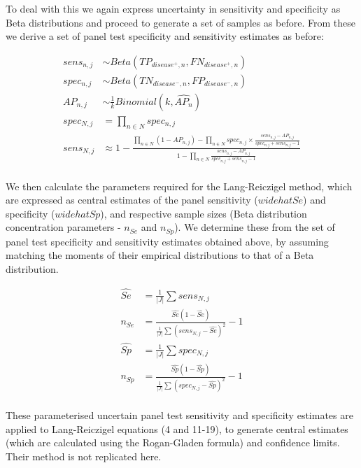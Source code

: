 \documentclass[a4paper, 12pt, twoside]{article}
\begin{document}
To deal with this we again express uncertainty in sensitivity and specificity as Beta distributions and proceed to generate a set of samples as before. From these we derive a set of panel test specificity and sensitivity estimates as before:

\begin{equation*}
\begin{aligned}
sens_{n,j} &\sim Beta(TP_{disease^+,n}, FN_{disease^+,n}) \\
spec_{n,j} &\sim Beta(TN_{disease^-,n}, FP_{disease^-,n}) \\
AP_{n,j} &\sim \frac{1}{k}Binomial(k, \widehat{AP_n}) \\
spec_{N,j} &= \prod_{n \in N}{spec_{n,j}} \\
sens_{N,j} &\approx 1-\frac{
  \prod_{n \in N}{(1-AP_{n,j})} - \prod_{n \in N}{spec_{n,j} \times \frac{sens_{n,j}-AP_{n,j}}{spec_{n,j} + sens_{n,j} - 1}}
}{
  1 - \prod_{n \in N}{ \frac{sens_{n,j}-AP_{n,j}}{spec_{n,j} + sens_{n,j} - 1} }
} \\
\end{aligned}
\end{equation*}

We then calculate the parameters required for the Lang-Reiczigel method\cite{lang2014}, which are expressed as central estimates of the panel sensitivity (\(widehat{Se}\)) and specificity (\(widehat{Sp}\)), and respective sample sizes (Beta distribution concentration parameters - \(n_{Se}\) and \(n_{Sp}\)). We determine these from the set of panel test specificity and sensitivity estimates obtained above, by assuming matching the moments of their empirical distributions to that of a Beta distribution.

\begin{equation*}
\begin{aligned}
\widehat{Se} &= \frac{1}{|J|}\sum{sens_{N,j}}\\
n_{Se} &= \frac{
\widehat{Se}(1-\widehat{Se})
}{
\frac{1}{|J|}\sum{(sens_{N,j}-\widehat{Se})^2}
}-1\\
\widehat{Sp} &= \frac{1}{|J|}\sum{spec_{N,j}}\\
n_{Sp} &= \frac{
\widehat{Sp}(1-\widehat{Sp})
}{
\frac{1}{|J|}\sum{(spec_{N,j}-\widehat{Sp})^2}
}-1\\
\end{aligned}
\end{equation*}

These parameterised uncertain panel test sensitivity and specificity estimates are applied to Lang-Reiczigel equations (4 and 11-19)\cite{lang2014}, to generate central estimates (which are calculated using the Rogan-Gladen formula) and confidence limits. Their method is not replicated here.
\end{document}
